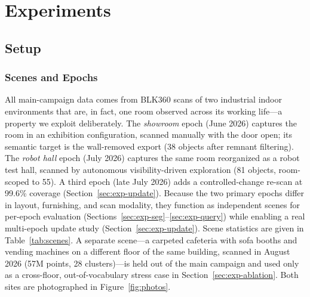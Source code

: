 \documentclass[electronics,article,accept,pdftex,moreauthors]{Definitions/mdpi}
\begin{document}
\section{Experiments}
\label{sec:experiments}

\subsection{Setup}
\label{sec:setup}

\subsubsection{Scenes and Epochs}
All main-campaign data comes from BLK360 scans of two industrial indoor
environments that
are, in fact, one room observed across its working life---a property we
exploit deliberately. The \emph{showroom} epoch (June 2026) captures the room
in an exhibition configuration, scanned manually with the door open; its
semantic target is the wall-removed export (38 objects after remnant
filtering). The \emph{robot hall} epoch (July 2026) captures the same room
reorganized as a robot test hall, scanned by autonomous visibility-driven
exploration (81 objects, room-scoped to 55). A third epoch (late July 2026)
adds a controlled-change re-scan at 99.6\% coverage (Section~\ref{sec:exp-update}).
Because the two primary epochs differ in layout, furnishing, and scan
modality, they function as independent scenes for per-epoch evaluation
(Sections~\ref{sec:exp-seg}--\ref{sec:exp-query}) while enabling a real
multi-epoch update study (Section~\ref{sec:exp-update}). Scene statistics are
given in Table~\ref{tab:scenes}. A separate scene---a carpeted cafeteria
with sofa booths and vending machines on a different floor of the same
building, scanned in August 2026 (57M points, 28 clusters)---is held out of
the main campaign and used only as a cross-floor, out-of-vocabulary stress
case in Section~\ref{sec:exp-ablation}. Both sites are photographed in
Figure~\ref{fig:photos}.
\end{document}
